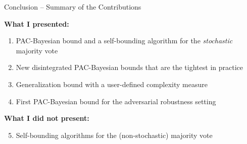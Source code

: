 \documentclass{slides}
\begin{document}

\begin{xframe}{Conclusion -- {\small Summary of the Contributions}}

\vspace{0.3cm}

{\bf What I presented:}\\[0.5cm]
\begin{enumerate}
\item PAC-Bayesian bound and a self-bounding algorithm for the {\it stochastic} majority vote \\[0.3cm]  
\item New disintegrated PAC-Bayesian bounds that are the tightest in practice \\[0.3cm]

\item Generalization bound with a user-defined complexity measure \\[0.3cm]
\item First PAC-Bayesian bound for the adversarial robustness setting\\
\end{enumerate}

\vspace{0.5cm}

{\bf What I did not present:}\\[0.5cm]
\begin{enumerate}
\setcounter{enumi}{4}
\item Self-bounding algorithms for the (non-stochastic) majority vote\\
\end{enumerate}
\end{xframe}

\end{document}
